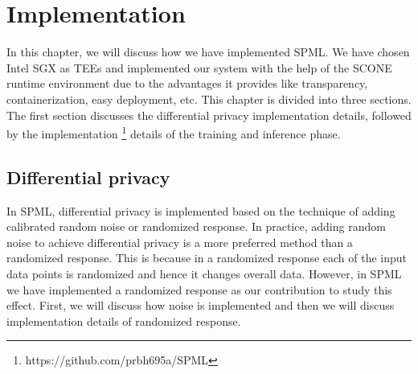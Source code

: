 \chapter{Implementation}
\label{sec:impl}
In this chapter, we will discuss how we have implemented SPML. We have chosen Intel SGX as TEEs and implemented our system with the help of the SCONE runtime environment due to the advantages it provides like transparency, containerization, easy deployment, etc. This chapter is divided into three sections. The first section discusses the differential privacy implementation details, followed by the implementation \footnote{https://github.com/prbh695a/SPML} details of the training and inference phase.
\section{Differential privacy}
In SPML, differential privacy is implemented based on the technique of adding calibrated random noise or randomized response. In practice, adding random noise to achieve differential privacy is a more preferred method than a randomized response. This is because in a randomized response each of the input data points is randomized and hence it changes overall data. However, in SPML we have implemented a randomized response as our contribution to study this effect. First, we will discuss how noise is implemented and then we will discuss implementation details of randomized response.

